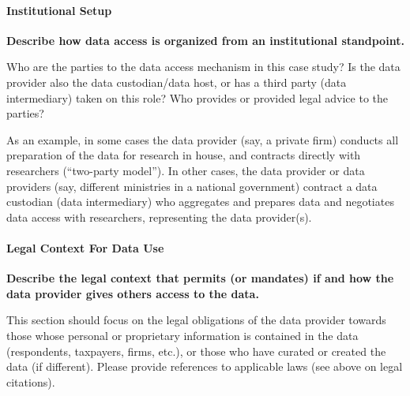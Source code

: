 \documentclass[
]{WileySix}
\begin{document}
\hypertarget{institutional-setup-8}{%
\paragraph{Institutional Setup}\label{institutional-setup-8}}

\textbf{Describe how data access is organized from an institutional standpoint.}

Who are the parties to the data access mechanism in this case study? Is the data provider also the data custodian/data host, or has a third party (data intermediary) taken on this role? Who provides or provided legal advice to the parties?

As an example, in some cases the data provider (say, a private firm) conducts all preparation of the data for research in house, and contracts directly with researchers (``two-party model''). In other cases, the data provider or data providers (say, different ministries in a national government) contract a data custodian (data intermediary) who aggregates and prepares data and negotiates data access with researchers, representing the data provider(s).

\hypertarget{legal-context-for-data-use-8}{%
\paragraph{Legal Context For Data Use}\label{legal-context-for-data-use-8}}

\textbf{Describe the legal context that permits (or mandates) if and how the data provider gives others access to the data.}

This section should focus on the legal obligations of the data provider towards those whose personal or proprietary information is contained in the data (respondents, taxpayers, firms, etc.), or those who have curated or created the data (if different). Please provide references to applicable laws (see above on legal citations).
\end{document}
